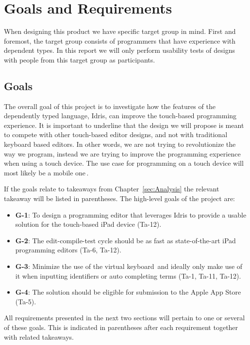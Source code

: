 \chapter{Goals and Requirements}
\label{sec:GoalsAndRequirements}
When designing this product we have specific target group in mind. 
First and foremost, the target group consists of programmers that have experience with dependent
types. In this report we will only perform usability tests of designs with people from this
target group as participants.

\section{Goals}
\label{sec:Goals}
The overall goal of this project is to investigate how the features of the dependently typed language, Idris, can improve the touch-based programming experience. 
It is important to underline that the design we will propose is meant to compete with other touch-based editor designs, and not with traditional keyboard based editors.
In other words, we are not trying to revolutionize the way we program, instead we are trying to improve the programming experience when using a touch device.
The use case for programming on a touch device will most likely be a mobile one\,\cite[p. 26]{nielsen2013mobile}.

If the goals relate to takeaways from Chapter~\ref{sec:Analysis} the relevant takeaway will be listed in parentheses. The high-level goals of the project are:

\begin{itemize} 
	\item \textbf{G-1}: To design a programming editor that leverages Idris to provide a usable solution for the touch-based iPad device
	(Ta-12).
	\item \textbf{G-2}: The edit-compile-test cycle should be as fast as state-of-the-art iPad programming editors
	(Ta-6, Ta-12).
	\item \textbf{G-3}: Minimize the use of the virtual keyboard\,\cite[pp. 76]{nielsen2013mobile} and ideally only make use of it when inputting identifiers or auto completing terms
	(Ta-1, Ta-11, Ta-12).
	\item \textbf{G-4}: The solution should be eligible for submission to the Apple App Store (Ta-5). 
\end{itemize}

All requirements presented in the next two sections will pertain to one or
several of these goals. This is indicated in parentheses after each requirement
together with related takeaways.


